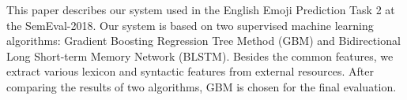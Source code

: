 This paper describes our system used in the English Emoji Prediction Task 2 at the SemEval-2018. Our system is based on two supervised machine learning algorithms: Gradient Boosting Regression Tree Method (GBM) and Bidirectional Long Short-term Memory Network (BLSTM). Besides the common features, we extract various lexicon and syntactic features from external resources. After comparing the results of two algorithms, GBM is chosen for the final evaluation.
